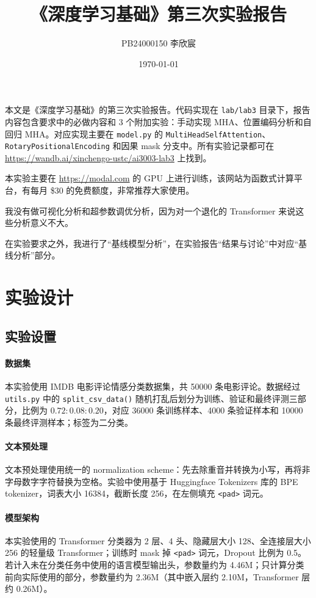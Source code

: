 \documentclass{ctexart}
\title{《深度学习基础》第三次实验报告}
\author{PB24000150 李欣宸}
\date{\today}
\begin{document}
\maketitle

本文是《深度学习基础》的第三次实验报告。代码实现在 \verb|lab/lab3| 目录下，报告内容包含要求中的必做内容和 3 个附加实验：手动实现 MHA、位置编码分析和自回归 MHA。对应实现主要在 \verb|model.py| 的 \verb|MultiHeadSelfAttention|、\verb|RotaryPositionalEncoding| 和因果 mask 分支中。所有实验记录都可在 \url{https://wandb.ai/xinchengo-ustc/ai3003-lab3} 上找到。

本实验主要在 \url{https://modal.com} 的 GPU 上进行训练，该网站为函数式计算平台，有每月 \$30 的免费额度，非常推荐大家使用。

我没有做可视化分析和超参数调优分析，因为对一个退化的 Transformer 来说这些分析意义不大。

在实验要求之外，我进行了“基线模型分析”，在实验报告“结果与讨论”中对应“基线分析”部分。


\section{实验设计}

\subsection{实验设置} \label{sec:experimental-setup}

\paragraph{数据集}
本实验使用 IMDB 电影评论情感分类数据集，共 50000 条电影评论。数据经过 \verb|utils.py| 中的 \verb|split_csv_data()| 随机打乱后划分为训练、验证和最终评测三部分，比例为 $0.72:0.08:0.20$，对应 36000 条训练样本、4000 条验证样本和 10000 条最终评测样本；标签为二分类。

\paragraph{文本预处理}
文本预处理使用统一的 normalization scheme：先去除重音并转换为小写，再将非字母数字字符替换为空格。实验中使用基于 Huggingface Tokenizers 库的 BPE tokenizer，词表大小 16384，截断长度 256，在左侧填充 \verb|<pad>| 词元。

\paragraph{模型架构}
本实验使用的 Transformer 分类器为 2 层、4 头、隐藏层大小 128、全连接层大小 256 的轻量级 Transformer；训练时 mask 掉 \verb|<pad>| 词元，Dropout 比例为 0.5。若计入未在分类任务中使用的语言模型输出头，参数量约为 4.46M；只计算分类前向实际使用的部分，参数量约为 2.36M（其中嵌入层约 2.10M，Transformer 层约 0.26M）。
\end{document}
